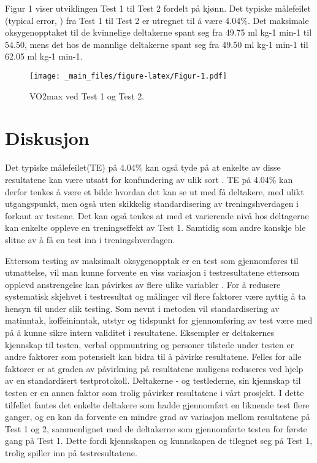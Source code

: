 \documentclass[
]{book}
\begin{document}
Figur 1 viser utviklingen Test 1 til Test 2 fordelt på kjønn. Det typiske målefeilet (typical error, \citep{hopkins2000}) fra Test 1 til Test 2 er utregnet til å være 4.04\%. Det maksimale oksygenopptaket til de kvinnelige deltakerne spant seg fra 49.75 ml kg-1 min-1 til 54.50, mens det hos de mannlige deltakerne spant seg fra 49.50 ml kg-1 min-1 til 62.05 ml kg-1 min-1.

\begin{figure}
\centering
\texttt{[image: \_main\_files/figure-latex/Figur-1.pdf]}
\caption{\label{fig:Figur}VO2max ved Test 1 og Test 2.}
\end{figure}

\hypertarget{diskusjon}{%
\section{Diskusjon}\label{diskusjon}}

Det typiske målefeilet(TE) på 4.04\% kan også tyde på at enkelte av disse resultatene kan være utsatt for konfundering av ulik sort \citep{hopkins2000}. TE på 4.04\% kan derfor tenkes å være et bilde hvordan det kan se ut med få deltakere, med ulikt utgangspunkt, men også uten skikkelig standardisering av treningshverdagen i forkant av testene. Det kan også tenkes at med et varierende nivå hos deltagerne kan enkelte oppleve en treningseffekt av Test 1. Samtidig som andre kanskje ble slitne av å få en test inn i treningshverdagen.

Ettersom testing av maksimalt oksygenopptak er en test som gjennomføres til utmattelse, vil man kunne forvente en viss variasjon i testresultatene ettersom opplevd anstrengelse kan påvirkes av flere ulike variabler \citep{halperin2015}. For å redusere systematisk skjehvet i testresultat og målinger vil flere faktorer være nyttig å ta hensyn til under slik testing. Som nevnt i metoden vil standardisering av matinntak, koffeininntak, utstyr og tidspunkt for gjennomføring av test være med på å kunne sikre intern validitet i resultatene. Eksempler er deltakernes kjennskap til testen, verbal oppmuntring og personer tilstede under testen er andre faktorer som potensielt kan bidra til å påvirke resultatene. Felles for alle faktorer er at graden av påvirkning på resultatene muligens reduseres ved hjelp av en standardisert testprotokoll. Deltakerne - og testlederne, sin kjennskap til testen er en annen faktor som trolig påvirker resultatene i vårt prosjekt. I dette tilfellet fantes det enkelte deltakere som hadde gjennomført en liknende test flere ganger, og en kan da forvente en mindre grad av variasjon mellom resultatene på Test 1 og 2, sammenlignet med de deltakerne som gjennomførte testen for første gang på Test 1. Dette fordi kjennskapen og kunnskapen de tilegnet seg på Test 1, trolig spiller inn på testresultatene.
\end{document}

